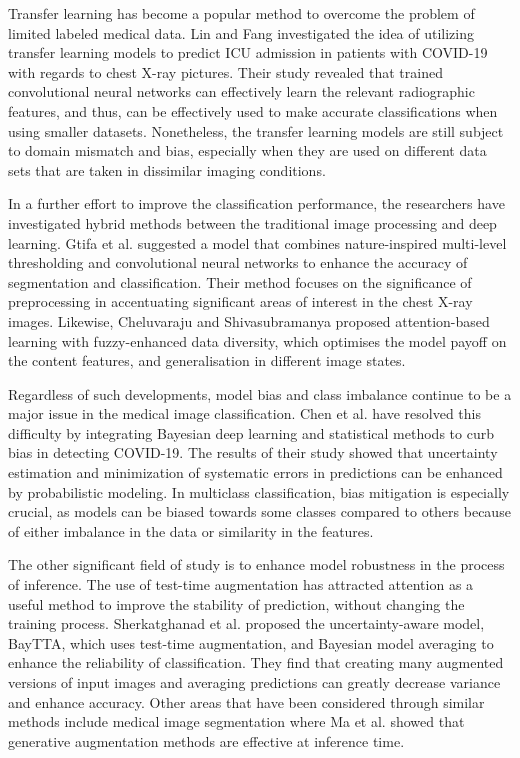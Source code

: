\documentclass[a4paper,fleqn]{cas-dc}
\begin{document}
Transfer learning has become a popular method to overcome the problem of limited labeled medical data. Lin and Fang \cite{ref2} investigated the idea of utilizing transfer learning models to predict ICU admission in patients with COVID-19 with regards to chest X-ray pictures. Their study revealed that trained convolutional neural networks can effectively learn the relevant radiographic features, and thus, can be effectively used to make accurate classifications when using smaller datasets. Nonetheless, the transfer learning models are still subject to domain mismatch and bias, especially when they are used on different data sets that are taken in dissimilar imaging conditions.

In a further effort to improve the classification performance, the researchers have investigated hybrid methods between the traditional image processing and deep learning. Gtifa et al. \cite{ref3} suggested a model that combines nature-inspired multi-level thresholding and convolutional neural networks to enhance the accuracy of segmentation and classification. Their method focuses on the significance of preprocessing in accentuating significant areas of interest in the chest X-ray images. Likewise, Cheluvaraju and Shivasubramanya \cite{ref5} proposed attention-based learning with fuzzy-enhanced data diversity, which optimises the model payoff on the content features, and generalisation in different image states.

Regardless of such developments, model bias and class imbalance continue to be a major issue in the medical image classification. Chen et al. \cite{ref4} have resolved this difficulty by integrating Bayesian deep learning and statistical methods to curb bias in detecting COVID-19. The results of their study showed that uncertainty estimation and minimization of systematic errors in predictions can be enhanced by probabilistic modeling. In multiclass classification, bias mitigation is especially crucial, as models can be biased towards some classes compared to others because of either imbalance in the data or similarity in the features.

The other significant field of study is to enhance model robustness in the process of inference. The use of test-time augmentation has attracted attention as a useful method to improve the stability of prediction, without changing the training process. Sherkatghanad et al. \cite{ref6} proposed the uncertainty-aware model, BayTTA, which uses test-time augmentation, and Bayesian model averaging to enhance the reliability of classification. They find that creating many augmented versions of input images and averaging predictions can greatly decrease variance and enhance accuracy. Other areas that have been considered through similar methods include medical image segmentation where Ma et al. \cite{ref7} showed that generative augmentation methods are effective at inference time.
\end{document}
